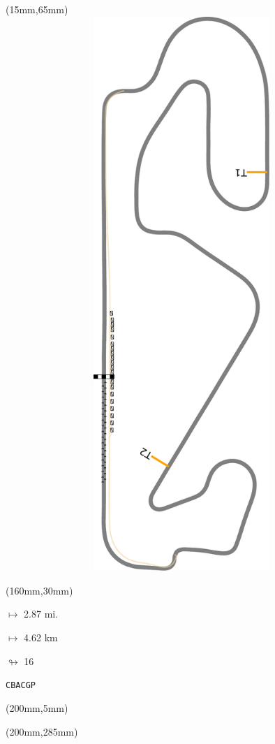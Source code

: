 \begin{textblock*}{185mm}(15mm,65mm)%
\centering
\mbox{\includegraphics[width=185mm,height=210mm,keepaspectratio]{PT/CBACGP.pdf}}
\end{textblock*}
\begin{textblock*}{40mm}(160mm,30mm)%
\Large
\par$\mapsto$ 2.87 mi.
\par$\mapsto$ 4.62 km
\par$\looparrowright$ 16
\par\hfill\tiny\tt CBACGP\\
\end{textblock*}
\begin{textblock*}{20mm}(200mm,5mm)%
\fbox{\thepage}
\label{CBACGP}
\end{textblock*}
\begin{textblock*}{20mm}(200mm,285mm)%
\fbox{\thepage}
\end{textblock*}

